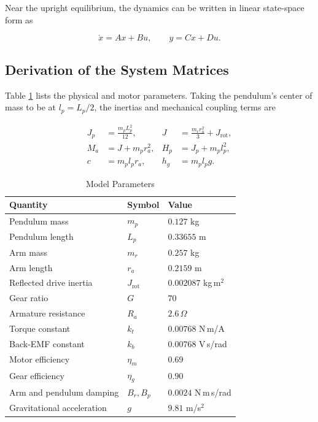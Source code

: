 \documentclass[conference]{IEEEtran}
\begin{document}
Near the upright equilibrium, the dynamics can be written in linear state-space form as

\begin{equation}
\dot x=Ax+Bu,\qquad y=Cx+Du.
\label{eq:model}
\end{equation}

\subsection{Derivation of the System Matrices}

Table \ref{tab:parameters} lists the physical and motor parameters. Taking the pendulum's center of mass to be at $l_p=L_p/2$, the inertias and mechanical coupling terms are

\begin{equation}
\begin{aligned}
J_p&=\frac{m_pL_p^2}{12}, &J&=\frac{m_rr_a^2}{3}+J_{\mathrm{rot}},\\
M_a&=J+m_pr_a^2, &H_p&=J_p+m_pl_p^2,\\
c&=m_pl_pr_a, &h_g&=m_pl_pg.
\end{aligned}
\label{eq:coefficients}
\end{equation}

\begin{table}[t]
\caption{Model Parameters}
\label{tab:parameters}
\centering\small
\begin{tabular}{@{}lll@{}}
\toprule
Quantity & Symbol & Value\\
\midrule
Pendulum mass & $m_p$ & $0.127$ kg\\
Pendulum length & $L_p$ & $0.33655$ m\\
Arm mass & $m_r$ & $0.257$ kg\\
Arm length & $r_a$ & $0.2159$ m\\
Reflected drive inertia & $J_{\mathrm{rot}}$ & $0.002087$ kg\,m$^2$\\
Gear ratio & $G$ & $70$\\
Armature resistance & $R_a$ & $2.6\,\Omega$\\
Torque constant & $k_t$ & $0.00768$ N\,m/A\\
Back-EMF constant & $k_b$ & $0.00768$ V\,s/rad\\
Motor efficiency & $\eta_m$ & $0.69$\\
Gear efficiency & $\eta_g$ & $0.90$\\
Arm and pendulum damping & $B_r,B_p$ & $0.0024$ N\,m\,s/rad\\
Gravitational acceleration & $g$ & $9.81$ m/s$^2$\\
\bottomrule
\end{tabular}
\end{table}
\end{document}
